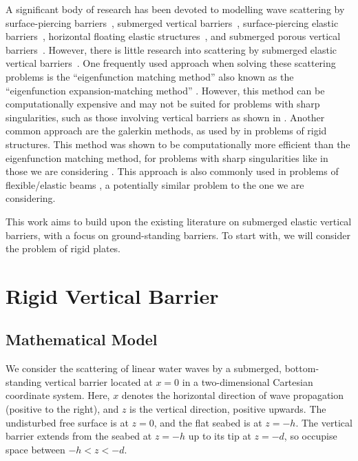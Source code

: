 \documentclass[a4paper,12pt]{report}
\begin{document}
A significant body of research has been devoted to modelling wave scattering by surface-piercing barriers~\cite{10.1093/imamat/35.3.339, PARSONS1994129, Porter1995ComplementaryAT}, submerged vertical barriers~\cite{Porter1995ComplementaryAT}, surface-piercing elastic barriers~\cite{doi:10.1137/090756557}, horizontal floating elastic structures~\cite{WU1995301, MontielFabienFranck2012NaEA}, and submerged porous vertical barriers~\cite{VIJAY2020102206}. However, there is little research into scattering by submerged elastic vertical barriers~\cite{elasticVerticalBerrier2013}. One frequently used approach when solving these scattering problems is the \enquote{eigenfunction matching method} also known as the \enquote{eigenfunction expansion-matching method} \cite{WU1995301, 10.1029/2007JC004434, 10.1093/imamat/35.3.339}. However, this method can be computationally expensive and may not be suited for problems with sharp singularities, such as those involving vertical barriers as shown in \cite{jmse13030398}. Another common approach are the galerkin methods, as used by \cite{Porter1995ComplementaryAT,10.1093/imamat/35.3.339,PARSONS1994129} in problems of rigid structures. This method was shown to be computationally more efficient than the eigenfunction matching method, for problems with sharp singularities like in those we are considering \cite{jmse13030398}. This approach is also commonly used in problems of flexible/elastic beams \cite{Lian2024}, a potentially similar problem to the one we are considering. 


This work aims to build upon the existing literature on submerged elastic vertical barriers, with a focus on ground-standing barriers. To start with, we will consider the problem of rigid plates.



\chapter{Rigid Vertical Barrier}
\section{Mathematical Model}
\label{sec:mathModel}
We consider the scattering of linear water waves by a submerged, bottom-standing vertical barrier located at $x=0$ in a two-dimensional Cartesian coordinate system. Here, $x$ denotes the horizontal direction of wave propagation (positive to the right), and $z$ is the vertical direction, positive upwards. The undisturbed free surface is at $z=0$, and the flat seabed is at $z=-h$. The vertical barrier extends from the seabed at $z=-h$ up to its tip at $z=-d$, so occupise space between $-h < z < -d$.
\end{document}
